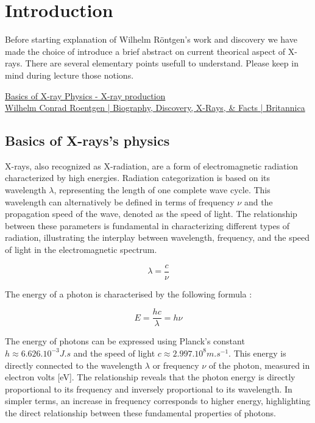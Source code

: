 \documentclass[a4paper,12pt]{report}
\begin{document}
\tableofcontents
{}

\setlength{\parskip}{10pt}


\newpage
\section*{Introduction}

Before starting explanation of Wilhelm Röntgen's work and discovery we have made the choice of introduce a brief abstract on current theorical aspect of X-rays. There are several elementary points usefull to understand. Please keep in mind during lecture those notions.

\href{https://radiologymasterclass.co.uk}{Basics of X-ray Physics - X-ray production}\\ 

\href{https://www.britannica.com/biography/Wilhelm-Rontgen}{Wilhelm Conrad Roentgen | Biography, Discovery, X-Rays, \& Facts | Britannica }
\subsection*{Basics of X-rays's physics}
X-rays, also recognized as X-radiation, are a form of electromagnetic radiation characterized by
high energies. Radiation categorization is based on its wavelength \(\lambda\), representing the length of
one complete wave cycle. This wavelength can alternatively be defined in terms of frequency \(\nu\)
and the propagation speed of the wave, denoted as the speed of light. The relationship
between these parameters is fundamental in characterizing different types of radiation, illustrating
the interplay between wavelength, frequency, and the speed of light in the electromagnetic
spectrum.

\begin{equation}
  \lambda = \frac{c}{\nu}
\end{equation}


The energy of a photon is characterised by the following formula :

\[E= \frac{hc}{\lambda}= h\nu\]

The energy of photons can be expressed using Planck's constant \(h \approx 6.626.10^{-3} J.s\) and the
speed of light \(c \approx 2.997.10^8 m.s^{-1}\). This energy is directly connected to the wavelength \(\lambda\) or
frequency \(\nu\) of the photon, measured in electron volts [eV]. The relationship reveals that the
photon energy is directly proportional to its frequency and inversely proportional to its
wavelength. In simpler terms, an increase in frequency corresponds to higher energy, highlighting
the direct relationship between these fundamental properties of photons.
\end{document}
